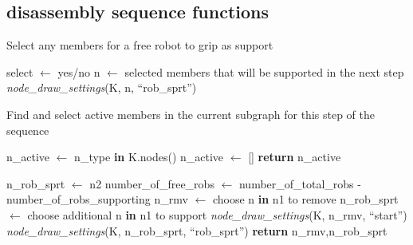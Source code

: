 \newpage
\subsection{disassembly sequence functions} \label{sec:appendixa_3}

    \begin{algorithm*}
        \scriptsize
        \caption*{Select any members for a free robot to grip as support}
        \begin{algorithmic}[1]
            \State
            select $\gets$ yes/no
                \State n $\gets$ selected members that will be supported in the next step
                \State \textit{node\_draw\_settings}(K, n, ``rob\_sprt'')
            \EndIf
        \EndFunction
        \end{algorithmic}
    \end{algorithm*}

    \vspace{-1.0em}
    
    \begin{algorithm*}
        \scriptsize
        \caption*{Find and select active members in the current subgraph for this step of the sequence}
        \begin{algorithmic}[1]
                \State n\_active $\gets$ n\_type \textbf{in} K.nodes()
            \Else
                \State n\_active $\gets$ []
            \EndIf
            \State \textbf{return} n\_active
        \EndFunction
        \end{algorithmic}
        \vspace{0.2em}
        \begin{algorithmic}[1]
            \State n\_rob\_sprt $\gets$ n2
            \State number\_of\_free\_robs $\gets$ number\_of\_total\_robs - number\_of\_robs\_supporting
                \State n\_rmv $\gets$ choose n \textbf{in} n1 to remove
                \State n\_rob\_sprt $\gets$ choose additional n \textbf{in} n1 to support
            \EndFor
            \State \textit{node\_draw\_settings}(K, n\_rmv, ``start'')
            \State \textit{node\_draw\_settings}(K, n\_rob\_sprt, ``rob\_sprt'')
            \State \textbf{return} n\_rmv,n\_rob\_sprt
        \EndFunction
        \end{algorithmic}        
    \end{algorithm*}

